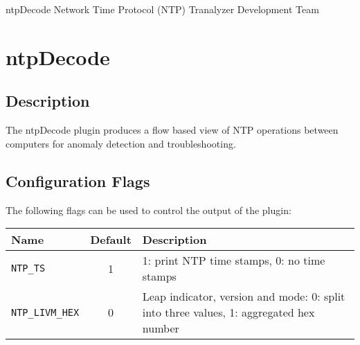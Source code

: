 \documentclass[documentation]{subfiles}
\begin{document}
\trantitle
    {ntpDecode}
    {Network Time Protocol (NTP)}
    {Tranalyzer Development Team}

\section{ntpDecode}\label{s:ntpDecode}

\subsection{Description}
The ntpDecode plugin produces a flow based view of NTP operations between computers for anomaly detection
and troubleshooting.

\subsection{Configuration Flags}
The following flags can be used to control the output of the plugin:
\begin{longtable}{lcl}
    \toprule
    {\bf Name} & {\bf Default} & {\bf Description} \\
    \midrule\endhead%
    {\tt NTP\_TS}        & 1 & 1: print NTP time stamps, 0: no time stamps\\
    {\tt NTP\_LIVM\_HEX} & 0 & Leap indicator, version and mode: 0: split into three values, 1: aggregated hex number\\
    \bottomrule
\end{longtable}
\end{document}
